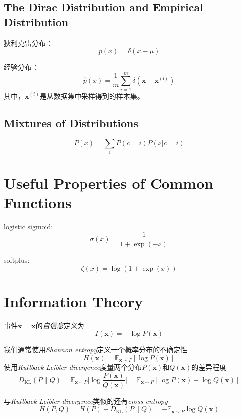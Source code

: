 \subsection{The Dirac Distribution and Empirical Distribution}

狄利克雷分布：
\begin{equation}
p(x)=\delta(x-\mu)
\end{equation}

经验分布：
\begin{equation}
\hat p(x)=\frac{1}{m}\sum_{i=1}^m\delta(\bm{x-x^{(i)}})
\end{equation}
其中，$\bm x^{(i)}$是从数据集中采样得到的样本集。

\subsection{Mixtures of Distributions}

\begin{equation}
P(x)=\sum_iP(c=i)P(x|c=i)
\end{equation}

\section{Useful Properties of Common Functions}

logistic sigmoid:
\begin{equation}
\sigma(x)=\frac{1}{1+\exp(-x)}
\end{equation}

softplus:
\begin{equation}
\zeta(x)=\log(1+\exp(x))
\end{equation}

\setcounter{section}{12}
\section{Information Theory}

事件$\mathbf x =\bm x$的\textit{自信息}定义为
\begin{equation}
I(\bm x)=-\log P(\bm x)
\end{equation}

我们通常使用\textit{Shannon entropy}定义一个概率分布的不确定性
\begin{equation}
H(\bm x)=\mathbb E_{\bm x\sim P}[\log P(\bm x)]
\end{equation}
使用\textit{Kullback-Leibler divergence}度量两个分布$P(\bm x)$和$Q(\bm x)$的差异程度
\begin{equation}
D_{\text{KL}}(P\|Q)=\mathbb E_{\bm x\sim P}\Big[\log\frac{P(\bm x)}{Q(\bm x)}\Big]=
\mathbb E_{\bm x\sim P}[\log P(\bm x)-\log Q(\bm x)]\end{equation}

与\textit{Kullback-Leibler divergence}类似的还有\textit{cross-entropy}
\begin{equation}
H(P,Q)=H(P)+D_{\text{KL}}(P\|Q)=-\mathbb E_{\bm x\sim P}\log Q(\bm x)
\end{equation}